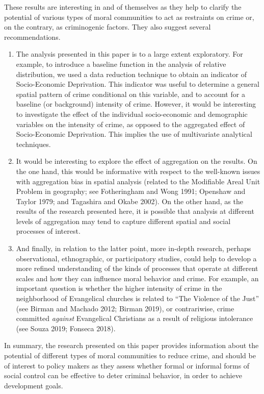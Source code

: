 \documentclass[smallextended]{svjour3}       %
\begin{document}
These results are interesting in and of themselves as they help to
clarify the potential of various types of moral communities to act as
restraints on crime or, on the contrary, as criminogenic factors. They
also suggest several recommendations.

\begin{enumerate}
\def\labelenumi{\arabic{enumi}.}
\item
  The analysis presented in this paper is to a large extent exploratory.
  For example, to introduce a baseline function in the analysis of
  relative distribution, we used a data reduction technique to obtain an
  indicator of Socio-Economic Deprivation. This indicator was useful to
  determine a general spatial pattern of crime conditional on this
  variable, and to account for a baseline (or background) intensity of
  crime. However, it would be interesting to investigate the effect of
  the individual socio-economic and demographic variables on the
  intensity of crime, as opposed to the aggregated effect of
  Socio-Economic Deprivation. This implies the use of multivariate
  analytical techniques.
\item
  It would be interesting to explore the effect of aggregation on the
  results. On the one hand, this would be informative with respect to
  the well-known issues with aggregation bias in spatial analysis
  (related to the Modifiable Areal Unit Problem in geography; see
  Fotheringham and Wong 1991; Openshaw and Taylor 1979; and Tagashira
  and Okabe 2002). On the other hand, as the results of the research
  presented here, it is possible that analysis at different levels of
  aggregation may tend to capture different spatial and social processes
  of interest.
\item
  And finally, in relation to the latter point, more in-depth research,
  perhaps observational, ethnographic, or participatory studies, could
  help to develop a more refined understanding of the kinds of processes
  that operate at different scales and how they can influence moral
  behavior and crime. For example, an important question is whether the
  higher intensity of crime in the neighborhood of Evangelical churches
  is related to ``The Violence of the Just'' (see Birman and Machado
  2012; Birman 2019), or contrariwise, crime committed \emph{against}
  Evangelical Christians as a result of religious intolerance (see Souza
  2019; Fonseca 2018).
\end{enumerate}

In summary, the research presented on this paper provides information
about the potential of different types of moral communities to reduce
crime, and should be of interest to policy makers as they assess whether
formal or informal forms of social control can be effective to deter
criminal behavior, in order to achieve development goals.
\end{document}
